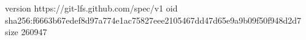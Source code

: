 version https://git-lfs.github.com/spec/v1
oid sha256:f6663b67edef8d97a774e1ac75827eee2105467dd47d65e9a9b09f50f948d2d7
size 260947
